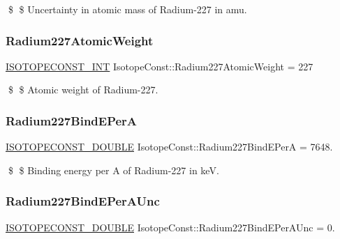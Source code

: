 \$ \$ Uncertainty in atomic mass of Radium-\/227 in amu. \mbox{\label{group___isotope_const-_radium-_ra227_ga8d503bc37c844ac19bbc774ad39cee57}} 
\subsubsection{\texorpdfstring{Radium227\+Atomic\+Weight}{Radium227AtomicWeight}}
{\footnotesize\ttfamily \mbox{\hyperlink{group___isotope_const-_macros_ga5f18360b3e99483a35c32d789e62621c}{I\+S\+O\+T\+O\+P\+E\+C\+O\+N\+S\+T\+\_\+\+I\+NT}} Isotope\+Const\+::\+Radium227\+Atomic\+Weight = 227}

\$ \$ Atomic weight of Radium-\/227. \mbox{\label{group___isotope_const-_radium-_ra227_ga3f3102a55dcbe38c724fd698e272c106}} 
\subsubsection{\texorpdfstring{Radium227\+Bind\+E\+PerA}{Radium227BindEPerA}}
{\footnotesize\ttfamily \mbox{\hyperlink{group___isotope_const-_macros_ga8f45a7272ce02c0b4c65c44636ed719a}{I\+S\+O\+T\+O\+P\+E\+C\+O\+N\+S\+T\+\_\+\+D\+O\+U\+B\+LE}} Isotope\+Const\+::\+Radium227\+Bind\+E\+PerA = 7648.}

\$ \$ Binding energy per A of Radium-\/227 in keV. \mbox{\label{group___isotope_const-_radium-_ra227_ga0619db4d713dace347484a1a0dfde32c}} 
\subsubsection{\texorpdfstring{Radium227\+Bind\+E\+Per\+A\+Unc}{Radium227BindEPerAUnc}}
{\footnotesize\ttfamily \mbox{\hyperlink{group___isotope_const-_macros_ga8f45a7272ce02c0b4c65c44636ed719a}{I\+S\+O\+T\+O\+P\+E\+C\+O\+N\+S\+T\+\_\+\+D\+O\+U\+B\+LE}} Isotope\+Const\+::\+Radium227\+Bind\+E\+Per\+A\+Unc = 0.}

